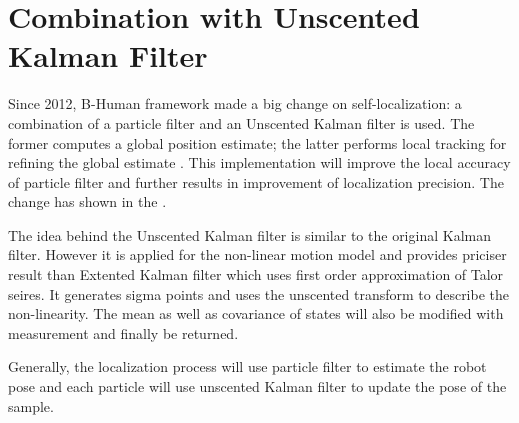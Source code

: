 \section{Combination with Unscented Kalman Filter}
Since 2012, B-Human framework made a big change on self-localization: a combination of a particle filter and an Unscented Kalman filter is used.
The former computes a global position estimate; the latter performs local tracking for refining the global estimate \cite{BHumanCodeRelease2012}. 
This implementation will improve the local accuracy of particle filter and further results in improvement of localization precision. The change has shown in the . 

The idea behind the Unscented Kalman filter is similar to the original Kalman filter. However it is applied for the non-linear motion model and provides priciser result than Extented Kalman filter which uses first order approximation of Talor seires. It generates sigma points and uses the unscented transform to describe the non-linearity. The mean as well as covariance of states will also be modified with measurement and finally be returned. 

Generally, the localization process will use particle filter to estimate the robot pose and each particle will use unscented Kalman filter to update the pose of the sample.
